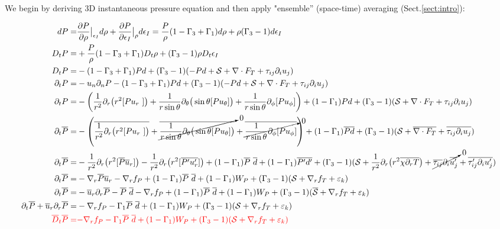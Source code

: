 \documentclass[10pt,paper=a4]{report}
\newcommand{\eht}{\overline}
\begin{document}
We begin by deriving 3D instantaneous pressure equation and then apply "ensemble'' (space-time) averaging (Sect.\ref{sect:intro}):

\fontsize{9pt}{20pt}

\begin{align}
dP = & \frac{\partial P}{\partial \rho}\big|_{\epsilon_I} d\rho + \frac{\partial P}{\partial \epsilon_I}\big|_\rho d\epsilon_I = \frac{P}{\rho}(1-\Gamma_3+\Gamma_1)d\rho + \rho(\Gamma_3 -1)d\epsilon_I \\
D_t P = & + \frac{P}{\rho}(1-\Gamma_3+\Gamma_1) D_t \rho + (\Gamma_3 -1)\rho D_t\epsilon_I \\
D_t P = & -(1-\Gamma_3+\Gamma_1)Pd + (\Gamma_3 -1)(-Pd + {\mathcal S} + \nabla \cdot F_T + \tau_{ij}\partial_i u_j) \\
\partial_t P =  & - u_n \partial_n P -(1-\Gamma_3+\Gamma_1)Pd + (\Gamma_3 -1)(-Pd + {\mathcal S} + \nabla \cdot F_T + \tau_{ij}\partial_i u_j) \\
\partial_t P = & -\left( \frac{1}{r^{2}}\partial_{r}\big(r^{2}[P u_{r}~]\big) + \frac{1}{r\sin{\theta}}\partial_{\theta} \big(\sin{\theta} [P u_{\theta}]\big) + \frac{1}{r\sin{\theta}}\partial_{\phi} [P u_{\phi}] \right) + (1-\Gamma_1)Pd + (\Gamma_3-1)({\mathcal S} + \nabla \cdot F_T + \tau_{ij}\partial_i u_j) \\
\partial_t \eht{P} = & -\left( \eht{\frac{1}{r^{2}}\partial_{r}\big(r^{2}[P u_{r}~]\big)} + \cancelto{0}{\eht{\frac{1}{r\sin{\theta}}\partial_{\theta} \big(\sin{\theta} [P u_{\theta}]\big)}} + \cancelto{0}{\eht{\frac{1}{r\sin{\theta}}\partial_{\phi} [P u_{\phi}]}} \right) + (1-\Gamma_1)\eht{Pd} + (\Gamma_3-1)({\mathcal S} + \eht{\nabla \cdot F_T} + \eht{\tau_{ij}\partial_i u_j}) \\
\partial_t \eht{P} = & -\frac{1}{r^{2}}\partial_{r}\big(r^{2}[\eht{P} \eht{u}_{r}]\big) - \frac{1}{r^{2}}\partial_{r}\big(r^{2}[\eht{P'u'_r}]\big) + (1-\Gamma_1)\eht{P} \ \eht{d} + (1-\Gamma_1)\eht{P'd'} + (\Gamma_3-1)({\mathcal S} + \frac{1}{r^{2}}\partial_{r}\big(r^{2} \eht{\chi \partial_r T} \big) + \cancelto{0}{\eht{\tau_{ij}} \partial_i \eht{{u'_j}}} + \eht{\tau'_{ij}\partial_i u'_j}) \\
\partial_t \eht{P} = & -\nabla_r \eht{P} \eht{u}_{r} - \nabla_r f_P + (1-\Gamma_1)\eht{P} \ \eht{d} + (1-\Gamma_1)W_P + (\Gamma_3-1)({\mathcal S} + \nabla_r f_T + \varepsilon_k) \\
\partial_t \eht{P} = & -\eht{u}_r \partial_r \eht{P}- \eht{P} \ \eht{d} - \nabla_r f_P + (1-\Gamma_1)\eht{P} \ \eht{d} + (1-\Gamma_1)W_P + (\Gamma_3-1)(\eht{{\mathcal S}} + \nabla_r f_T + \varepsilon_k) \\
\partial_t \eht{P} + \eht{u}_r \partial_r \eht{P} = & -\nabla_r f_P  -\Gamma_1 \eht{P} \ \eht{d} + (1-\Gamma_1)W_P + (\Gamma_3-1)({\mathcal S} + \nabla_r f_T + \varepsilon_k) \\
{\color{red} \eht{D}_t \eht{P} = }& {\color{red} -\nabla_r f_P  -\Gamma_1 \eht{P} \ \eht{d} + (1-\Gamma_1)W_P + (\Gamma_3-1)({\mathcal S} + \nabla_r f_T + \varepsilon_k)}
\end{align}
\end{document}
